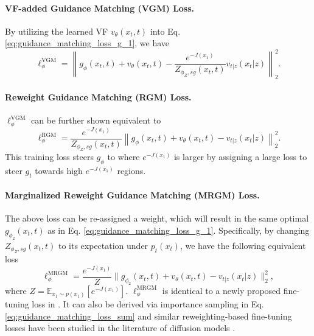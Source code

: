 \paragraph{VF-added Guidance Matching (VGM) Loss.} By utilizing the learned VF $v_\theta(x_t, t)$ into Eq. \eqref{eq:guidance_matching_loss_g_1}, we have 
\begin{equation}
    \ell_\phi^{\text{VGM}} = \left\|g_{\phi}(x_t,t) + v_\theta(x_t,t) - \frac{e^{-J(x_1)}}{Z_{\phi_Z,sg}(x_t,t)}v_{t|z}(x_t|z)\right\|_2^2.
\end{equation}

\paragraph{Reweight Guidance Matching (RGM) Loss.} $\ell_\phi^{\text{VGM}}$ can be further shown equivalent to 
\begin{equation}\label{eq:guidance_matching_loss_g_3_loss}
    \ell_\phi^{\text{RGM}}=\frac{e^{-J(x_1)}}{Z_{\phi_Z,sg}(x_t,t)} \left\|g_{\phi}(x_t,t) + v_\theta(x_t,t) - v_{t|z}(x_t|z)\right\|_2^2.
\end{equation}
This training loss steers $g_\phi$ to where $e^{-J(x_1)}$ is larger by assigning a large loss to steer $g_t$ towards high $e^{-J(x_1)}$ regions.

\paragraph{Marginalized Reweight Guidance Matching (MRGM) Loss.} The above loss can be re-assigned a weight, which will result in the same optimal $g_{\phi_2}(x_t,t)$ as in Eq. \eqref{eq:guidance_matching_loss_g_1}. Specifically, by changing $Z_{\phi_Z,sg}(x_t,t)$ to its expectation under $p_t(x_t)$, we have the following equivalent loss
\begin{equation}\label{eq:guidance_matching_loss_g_4_loss}
    \ell_\phi^{\text{MRGM}}=\frac{e^{-J(x_1)}}{Z} \|g_{\phi_2}(x_t,t) + v_\theta(x_t,t) - v_{t|z}(x_t|z)\|_2^2,
\end{equation}
where $Z = \mathbb{E}_{x_1\sim p(x_1)}[e^{-J(x_1)}]$.
$\ell_\phi^{\text{MRGM}}$ is identical to a newly proposed fine-tuning loss in \citet{anonymous2025energyweighted}. It can also be derived via importance sampling in Eq. \ref{eq:guidance_matching_loss_sum} and
similar reweighting-based fine-tuning losses have been studied in the literature of diffusion models \citep{fan_dpok_2023}.


